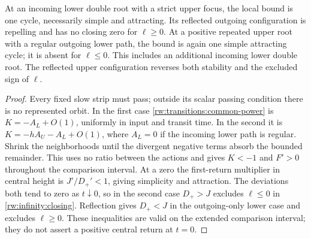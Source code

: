 \begin{proposition}\label{rw:infinity:slow-domination}
At an incoming lower double root with a strict upper focus, the local
bound is one cycle, necessarily simple and attracting. Its reflected
outgoing configuration is repelling and has no closing zero for
$\ell\ge0$. At a positive repeated upper root with a regular outgoing
lower path, the bound is again one simple attracting cycle; it is absent
for $\ell\le0$. This includes an additional incoming lower double root.
The reflected upper configuration reverses both stability and the
excluded sign of $\ell$.
\end{proposition}
\begin{proof}
Every fixed slow strip must pass; outside its scalar passing condition
there is no represented orbit. In the first case
\eqref{rw:transitions:common-power} is $K=-A_L+O(1)$, uniformly in input
and transit time. In the second it is
$K=-hA_U-A_L+O(1)$, where $A_L=0$ if the incoming lower path
is regular. Shrink the neighborhoods until the divergent negative terms
absorb the bounded remainder. This uses no ratio between the actions and
gives $K<-1$ and $F'>0$ throughout the comparison interval. At a
zero the first-return multiplier in central height is
$J'/D_+'<1$, giving simplicity and attraction.
The deviations both tend to zero as $t\downarrow0$, so in the
second case $D_+>J$ excludes $\ell\le0$ in
\eqref{rw:infinity:closing}. Reflection gives $D_+<J$ in the
outgoing-only lower case and excludes $\ell\ge0$. These inequalities
are valid on the extended comparison interval; they do not assert a
positive central return at $t=0$.
\end{proof}

